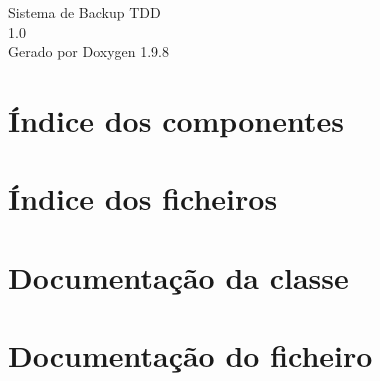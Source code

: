 \documentclass[twoside]{book}
\newcommand{\+}{\discretionary{\mbox{\scriptsize$\hookleftarrow$}}{}{}}
\newcommand{\clearemptydoublepage}{%
    \newpage{\pagestyle{empty}\cleardoublepage}%
  }
\begin{document}
  \raggedbottom
    \hypersetup{pageanchor=false,
                bookmarksnumbered=true,
                pdfencoding=unicode
               }
  \begin{titlepage}
  \vspace*{7cm}
  \begin{center}%
  {\Large Sistema de Backup TDD}\\
  [1ex]\large 1.\+0 \\
  \vspace*{1cm}
  {\large Gerado por Doxygen 1.9.8}\\
  \end{center}
  \end{titlepage}
  \clearemptydoublepage
  \tableofcontents
  \clearemptydoublepage
  \hypersetup{pageanchor=true}

\chapter{Índice dos componentes}

\chapter{Índice dos ficheiros}

\chapter{Documentação da classe}

\chapter{Documentação do ficheiro}




  \backmatter
  \newpage
  \clearemptydoublepage
  \printindex
\end{document}
